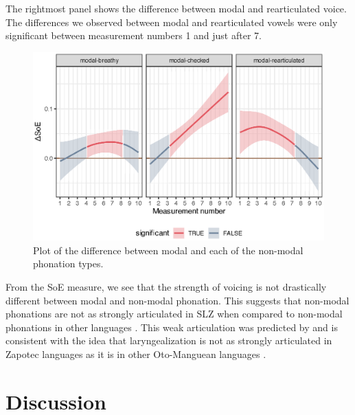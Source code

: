 The rightmost panel shows the difference between modal and rearticulated voice. The differences we observed between modal and rearticulated vowels were only significant between measurement numbers 1 and just after 7. 

\begin{figure}[h!]
    \centering
    \includegraphics[width = \linewidth]{images/LCH_GAMMs/soe_model_diff.eps}
    \caption{Plot of the difference between modal and each of the non-modal phonation types.}
    \label{fig:soe_model_diff}
\end{figure}

From the SoE measure, we see that the strength of voicing is not drastically different between modal and non-modal phonation. This suggests that non-modal phonations are not as strongly articulated in SLZ when compared to non-modal phonations in other languages \citep[e.g.,][]{garellekVoicingGlottalConsonants2021,garellekMarginsPhonologyPhonetics2025,wellerInteractionsToneGlottalization2023,wellerLexicalToneVowel2023,wellerVoiceQualityTone2024}. This weak articulation was predicted by \citeauthor{silvermanLaryngealComplexityOtomanguean1997} and is consistent with the idea that laryngealization is not as strongly articulated in Zapotec languages as it is in other Oto-Manguean languages \citep{herrerazendejasAmuzgoZapotecTwo2000}.

\section{Discussion}\label{sec:discussion_of_lc}

